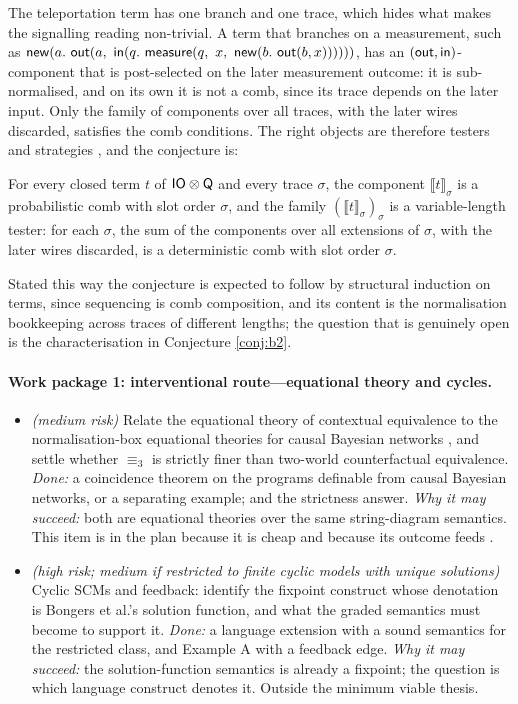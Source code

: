 The teleportation term has one branch and one trace, which hides what makes the signalling reading non-trivial. A term that branches on a measurement, such as $\opnew(a.\ \opout(a,\ \opin(q.\ \opmeasure(q,\ x,\ \opnew(b.\ \opout(b, x))))))$, has an $(\mathsf{out},\mathsf{in})$-component that is post-selected on the later measurement outcome: it is sub-normalised, and on its own it is not a comb, since its trace depends on the later input. Only the family of components over all traces, with the later wires discarded, satisfies the comb conditions. The right objects are therefore testers and strategies \cite{chiribella2009networks,gutoski2007games}, and the conjecture is:
\begin{conj}\label{conj:b1}
For every closed term $t$ of $\mathsf{IO}\otimes\mathsf{Q}$ and every trace $\sigma$, the component $\llbracket t\rrbracket_\sigma$ is a probabilistic comb with slot order $\sigma$, and the family $(\llbracket t\rrbracket_\sigma)_\sigma$ is a variable-length tester: for each $\sigma$, the sum of the components over all extensions of $\sigma$, with the later wires discarded, is a deterministic comb with slot order $\sigma$.
\end{conj}
\noindent Stated this way the conjecture is expected to follow by structural induction on terms, since sequencing is comb composition, and its content is the normalisation bookkeeping across traces of different lengths; the question that is genuinely open is the characterisation in Conjecture \ref{conj:b2}.

\paragraph{Work package 1: interventional route---equational theory and cycles.}
\begin{itemize}[nosep]
\item[1a] \textit{(medium risk)} Relate the equational theory of contextual equivalence to the normalisation-box equational theories for causal Bayesian networks \cite{jacobsszelesstein2025inference,agrawal2026equational}, and settle whether $\equiv_3$ is strictly finer than two-world counterfactual equivalence. \emph{Done:} a coincidence theorem on the programs definable from causal Bayesian networks, or a separating example; and the strictness answer. \emph{Why it may succeed:} both are equational theories over the same string-diagram semantics. This item is in the plan because it is cheap and because its outcome feeds .
\item[1b] \textit{(high risk; medium if restricted to finite cyclic models with unique solutions)} Cyclic SCMs and feedback: identify the fixpoint construct whose denotation is Bongers et al.'s solution function, and what the graded semantics must become to support it. \emph{Done:} a language extension with a sound semantics for the restricted class, and Example A with a feedback edge. \emph{Why it may succeed:} the solution-function semantics is already a fixpoint; the question is which language construct denotes it. Outside the minimum viable thesis.
\end{itemize}

